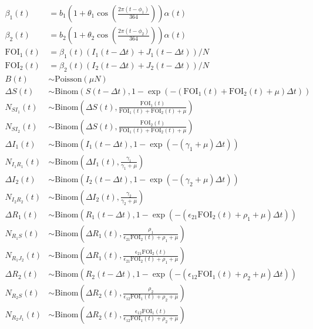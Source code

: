 \documentclass[12pt]{article}
\begin{document}
\begin{align}
\beta_1(t) &= b_1 \left(1 + \theta_1 \cos\left(\frac{2 \pi (t - \phi_1)}{364}\right)\right) \alpha(t)\\
\beta_2(t) &= b_2 \left(1 + \theta_2 \cos\left(\frac{2 \pi (t - \phi_2)}{364}\right)\right) \alpha(t)\\
\textrm{FOI}_1(t) &= \beta_1(t) (I_1(t- \Delta t) + J_1(t- \Delta t))/N\\
\textrm{FOI}_2(t) &= \beta_2(t) (I_2(t- \Delta t) + J_2(t- \Delta t))/N\\
B(t) &\sim \mathrm{Poisson}(\mu N)\\
\Delta S(t) &\sim \mathrm{Binom}\left(S(t-\Delta t), 1- \exp(-(\textrm{FOI}_1(t)+\textrm{FOI}_2(t) + \mu) \Delta t )\right) \\
N_{SI_1}(t) &\sim \mathrm{Binom}\left(\Delta S(t), \frac{\textrm{FOI}_1(t)}{\textrm{FOI}_1(t) + \textrm{FOI}_2(t) + \mu} \right)\\
N_{SI_2}(t) &\sim \mathrm{Binom}\left(\Delta S(t), \frac{\textrm{FOI}_2(t)}{\textrm{FOI}_1(t) + \textrm{FOI}_2(t) + \mu} \right)\\
\Delta I_1(t) &\sim \mathrm{Binom}\left(I_1(t-\Delta t), 1- \exp(-(\gamma_1 + \mu) \Delta t )\right) \\
N_{I_1R_1}(t) &\sim \mathrm{Binom}\left(\Delta I_1(t), \frac{\gamma_1}{\gamma_1 + \mu} \right)\\
\Delta I_2(t) &\sim \mathrm{Binom}\left(I_2(t-\Delta t), 1- \exp(-(\gamma_2 + \mu) \Delta t )\right) \\
N_{I_2R_2}(t) &\sim \mathrm{Binom}\left(\Delta I_2(t), \frac{\gamma_2}{\gamma_2 + \mu} \right)\\
\Delta R_1(t) &\sim \mathrm{Binom}\left(R_1(t-\Delta t), 1- \exp(-(\epsilon_{21} \textrm{FOI}_2(t) + \rho_1 + \mu) \Delta t )\right) \\
N_{R_1S}(t) &\sim \mathrm{Binom}\left(\Delta R_1(t), \frac{\rho_1}{\epsilon_{21} \textrm{FOI}_2(t) + \rho_1 + \mu} \right)\\
N_{R_1J_2}(t) &\sim \mathrm{Binom}\left(\Delta R_1(t), \frac{\epsilon_{21} \textrm{FOI}_2(t)}{\epsilon_{21} \textrm{FOI}_2(t) + \rho_1 + \mu} \right)\\
\Delta R_2(t) &\sim \mathrm{Binom}\left(R_2(t-\Delta t), 1- \exp(-(\epsilon_{12} \textrm{FOI}_1(t) + \rho_2 + \mu) \Delta t )\right) \\
N_{R_2S}(t) &\sim \mathrm{Binom}\left(\Delta R_2(t), \frac{\rho_2}{\epsilon_{12} \textrm{FOI}_1(t) + \rho_2 + \mu} \right)\\
N_{R_2J_1}(t) &\sim \mathrm{Binom}\left(\Delta R_2(t), \frac{\epsilon_{12} \textrm{FOI}_1(t)}{\epsilon_{12} \textrm{FOI}_1(t) + \rho_2 + \mu} \right)\\

\end{align}
\end{document}
